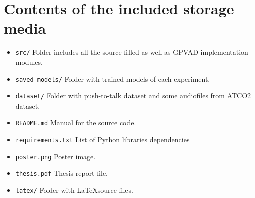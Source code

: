 
%

\chapter{Contents of the included storage media}
\begin{itemize}
    \item \texttt{src/} Folder includes all the source filled as well as GPVAD implementation modules. 
    \item \texttt{saved\_models/} Folder with trained models of each experiment. 
    \item \texttt{dataset/} Folder with push-to-talk dataset and some audiofiles from ATCO2 dataset.
    \item \texttt{README.md} Manual for the source code.
    \item \texttt{requirements.txt} List of Python libraries dependencies
    \item \texttt{poster.png} Poster image.
    \item \texttt{thesis.pdf} Thesis report file.
    \item \texttt{latex/} Folder with \LaTeX source files.
\end{itemize}





%
